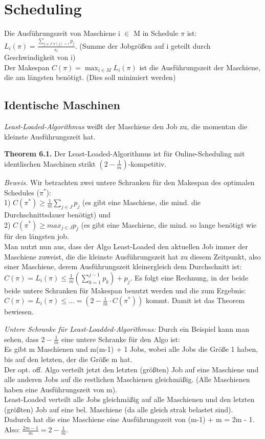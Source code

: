 \chapter{Scheduling}

Die Ausführungszeit von Maschiene i $\in$ M in Schedule $\pi$ ist: $L_{i}(\pi) = \tfrac{\sum_{j \in J: \pi(j)=i} p_{j}}{s_{i}}$. (Summe der Jobgrößen auf i geteilt durch Geschwindigkeit von i) \\
Der Makespan $C(\pi) = \max_{i \in M} L_{i}(\pi)$ ist die Ausführungszeit der Maschiene, die am längsten benötigt. (Dies soll minimiert werden)

\section{Identische Maschinen}

\textit{Least-Loaded-Algorithmus} weißt der Maschiene den Job zu, die momentan die kleinste Ausführungszeit hat.

\textbf{Theorem 6.1.} Der Least-Loaded-Algorithmus ist für Online-Scheduling mit identlischen Maschinen strikt $(2-\frac{1}{m})$-kompetitiv.

\textit{Beweis.} Wir betrachten zwei untere Schranken für den Makespan des optimalen Schedules ($\pi^{*}$): \\
1) $C(\pi^{*}) \ge \tfrac{1}{m} \sum_{j \in J} p_{j}$ (es gibt eine Maschiene, die mind. die Durchschnittsdauer benötigt) und  \\
2) $C(\pi^{*}) \ge max_{j \in J} p_{j}$ (es gibt eine Maschiene, die mind. so lange benötigt wie für den längsten job. \\
Man nutzt nun aus, dass der Algo Least-Loaded den aktuellen Job immer der Maschiene zuweist, die die kleinste Ausführungszeit hat zu diesem Zeitpunkt, also einer Maschiene, derem Ausführungszeit kleinergleich dem Durchschnitt ist: $C(\pi) = L_{i}(\pi) \le \tfrac{1}{m} (\sum_{k=1}^{j-1}p_{k}) + p_{j}$. Es folgt eine Rechnung, in der beide beide untere Schranken für Makespan benutzt werden und die zum Ergebnis: $C(\pi) = L_{i}(\pi) \le ... = (2-\tfrac{1}{m} \cdot C(\pi^{*}))$ kommt. Damit ist das Theorem bewiesen.

\textit{Untere Schranke für Least-Loadded-Algorithmus:} Durch ein Beispiel kann man sehen, dass $2 - \tfrac{1}{m}$ eine untere Schranke für den Algo ist: \\
Es gibt m Maschienen und m(m-1) + 1 Jobs, wobei alle Jobs die Größe 1 haben, bis auf den letzten, der die Größe m hat. \\
Der opt. off. Algo verteilt jetzt den letzten (größten) Job auf eine Maschiene und alle anderen Jobs auf die restlichen Maschienen gleichmäßig. (Alle Maschienen haben eine Ausführungszeit von m). \\
Least-Loaded verteilt alle Jobs gleichmäßig auf alle Maschienen und den letzten (größten) Job auf eine bel. Maschiene (da alle gleich strak belastet sind). Dadurch hat die eine Maschiene eine Ausführungszeit von (m-1) + m = 2m - 1. Also: $\tfrac{2m - 1}{m} = 2 - \tfrac{1}{m}$.

